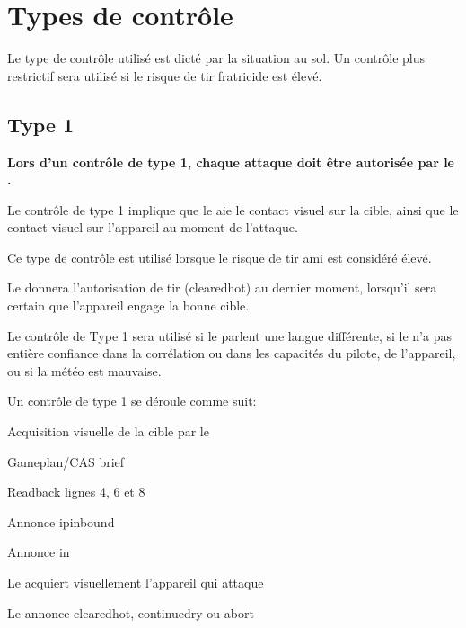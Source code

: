 \section{Types de contrôle}
\label{controltypessection}

Le type de contrôle utilisé est dicté par la situation au sol. Un contrôle plus restrictif sera utilisé si le risque de tir fratricide est élevé.



\subsection{Type 1}
\e
    \item \textbf{Lors d'un contrôle de type 1, chaque attaque doit être autorisée par le \ja{}.}
    \item Le contrôle de type 1 implique que le \ja{} aie le contact visuel sur la cible, ainsi que le contact visuel sur l'appareil au moment de l'attaque.
    \item Ce type de contrôle est utilisé lorsque le risque de tir ami est considéré élevé.
    \item Le \ja{} donnera l'autorisation de tir (\acrshort{clearedhot}) au dernier moment, lorsqu'il sera certain que l'appareil engage la bonne cible.
    \item Le contrôle de Type 1 sera utilisé si le \ja{} parlent une langue différente, si le \ja{} n'a pas entière confiance dans la corrélation ou dans les capacités du pilote, de l'appareil, ou si la météo est mauvaise.\vskip5mm
    \item Un contrôle de type 1 se déroule comme suit:
    \ee
        \item Acquisition visuelle de la cible par le \ja{}
        \item Gameplan/CAS brief
        \item Readback lignes 4, 6 et 8
        \item Annonce \acrshort{ipinbound}
        \item Annonce \acrshort{in}
        \item Le \ja{} acquiert visuellement l'appareil qui attaque
        \item Le \ja{} annonce \acrshort{clearedhot}, \acrshort{continuedry} ou \acrshort{abort}
    \ed
\ed

